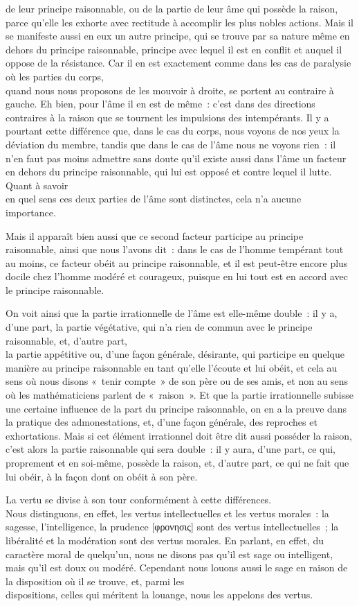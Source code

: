 \documentclass[french,twoside]{book} %
\begin{document}
de leur principe raisonnable, ou de la partie de leur âme qui possède la raison, parce qu’elle les exhorte avec rectitude à accomplir les plus nobles actions. Mais il se manifeste aussi en eux un autre principe, qui se trouve par sa nature même en dehors du principe raisonnable, principe avec lequel il est en conflit et auquel il oppose de la résistance. Car il en est exactement comme dans les cas de paralysie où les parties du corps, \\
quand nous nous proposons de les mouvoir à droite, se portent au contraire à gauche. Eh bien, pour l’âme il en est de même : c’est dans des directions contraires à la raison que se tournent les impulsions des intempérants. Il y a pourtant cette différence que, dans le cas du corps, nous voyons de nos yeux la déviation du membre, tandis que dans le cas de l’âme nous ne voyons rien : il n’en faut pas moins admettre sans doute qu’il existe aussi dans l’âme un facteur en dehors du principe raisonnable, qui lui est opposé et contre lequel il lutte. Quant à savoir \\
en quel sens ces deux parties de l’âme sont distinctes, cela n’a aucune importance.\par
Mais il apparaît bien aussi que ce second facteur participe au principe raisonnable, ainsi que nous l’avons dit : dans le cas de l’homme tempérant tout au moins, ce facteur obéit au principe raisonnable, et il est peut-être encore plus docile chez l’homme modéré et courageux, puisque en lui tout est en accord avec le principe raisonnable.\par
On voit ainsi que la partie irrationnelle de l’âme est elle-même double : il y a, d’une part, la partie végétative, qui n’a rien de commun avec le principe raisonnable, et, d’autre part, \\
la partie appétitive ou, d’une façon générale, désirante, qui participe en quelque manière au principe raisonnable en tant qu’elle l’écoute et lui obéit, et cela au sens où nous disons « tenir compte » de son père ou de ses amis, et non au sens où les mathématiciens parlent de « raison ». Et que la partie irrationnelle subisse une certaine influence de la part du principe raisonnable, on en a la preuve dans la pratique des admonestations, et, d’une façon générale, des reproches et exhortations.  Mais si cet élément irrationnel doit être dit aussi posséder la raison, c’est alors la partie raisonnable qui sera double : il y aura, d’une part, ce qui, proprement et en soi-même, possède la raison, et, d’autre part, ce qui ne fait que lui obéir, à la façon dont on obéit à son père.\par
La vertu se divise à son tour conformément à cette différences. \\
Nous distinguons, en effet, les vertus intellectuelles et les vertus morales : la sagesse, l’intelligence, la prudence [φρονησις] sont des vertus intellectuelles ; la libéralité et la modération sont des vertus morales. En parlant, en effet, du caractère moral de quelqu’un, nous ne disons pas qu’il est sage ou intelligent, mais qu’il est doux ou modéré. Cependant nous louons aussi le sage en raison de la disposition où il se trouve, et, parmi les \\
dispositions, celles qui méritent la louange, nous les appelons des vertus.
\end{document}
